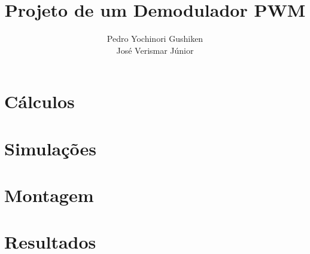 \documentclass[a4paper,10pt]{report}
\title{Projeto de um Demodulador PWM}
\author{Pedro Yochinori Gushiken\\ José Verismar Júnior}
\begin{document}
\maketitle

\chapter*{Cálculos}

\chapter*{Simulações}

\chapter*{Montagem}

\chapter*{Resultados}

\end{document}
